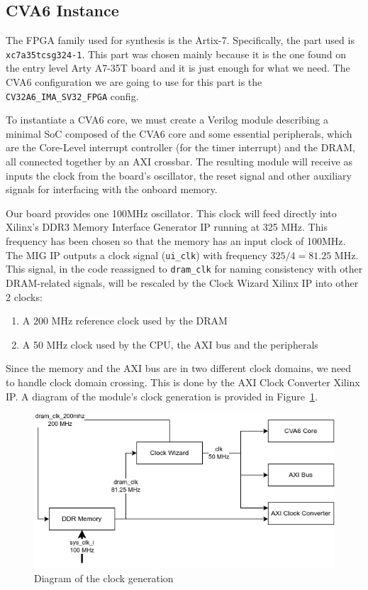\documentclass[a4paper,11pt]{article}
\begin{document}
\subsection{CVA6 Instance}

The FPGA family used for synthesis is the Artix-7. Specifically, the part used
is \texttt{xc7a35tcsg324-1}. This part was chosen mainly because it is the one
found on the entry level Arty A7-35T board and it is just enough for what we
need. The CVA6 configuration we are going to use for this part is the
\texttt{CV32A6\_IMA\_SV32\_FPGA} config.

To instantiate a CVA6 core, we must create a Verilog module describing a minimal
SoC composed of the CVA6 core and some essential peripherals, which are the
Core-Level interrupt controller (for the timer interrupt) and the DRAM, all
connected together by an AXI crossbar. The resulting module will receive as inputs
the clock from the board's oscillator, the reset signal and other auxiliary signals
for interfacing with the onboard memory.

Our board provides one 100MHz oscillator. This clock will feed directly into
Xilinx's DDR3 Memory Interface Generator IP running at 325 MHz. This frequency
has been chosen so that the memory has an input clock of 100MHz. The MIG IP
outputs a clock signal (\texttt{ui\_clk}) with frequency $325 / 4 = 81.25$ MHz.
This signal, in the code reassigned to \texttt{dram\_clk} for naming consistency
with other DRAM-related signals, will be rescaled by the Clock Wizard Xilinx IP
into other 2 clocks:

\begin{enumerate}
  \item A 200 MHz reference clock used by the DRAM
  \item A 50 MHz clock used by the CPU, the AXI bus and the peripherals
\end{enumerate}

Since the memory and the AXI bus are in two different clock domains, we need to
handle clock domain crossing. This is done by the AXI Clock Converter Xilinx
IP. A diagram of the module's clock generation is provided in Figure~\ref{clock-diag}.

\begin{figure}[H]
  \centering
  \includegraphics[width=\textwidth]{./img/clocking_diagram.png}
  \caption{Diagram of the clock generation}%
  \label{clock-diag}
\end{figure}
\end{document}

